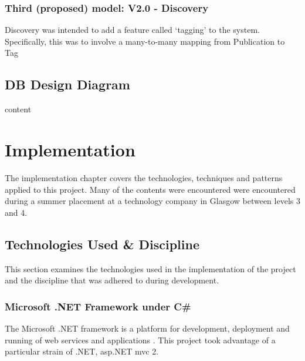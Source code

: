 \documentclass{l4proj}
\begin{document}
\subsection{Third (proposed) model: V2.0 - Discovery}
\label{designDiscovery}
Discovery was intended to add a feature called `tagging' to the system.  \\
Specifically, this was to involve a many-to-many mapping from Publication to Tag


\section{DB Design Diagram}
content


\chapter{Implementation}
\label{impl}
The implementation chapter covers the technologies, techniques and patterns applied to this project.  Many of the contents were encountered were encountered during a summer placement at a technology company in Glasgow between levels 3 and 4.  

\section{Technologies Used \& Discipline}
This section examines the technologies used in the implementation of the project and the discipline that was adhered to during development.

\subsection{Microsoft .NET Framework under C\#}
The Microsoft .NET framework is a platform for development, deployment and running of web services and applications \cite{whatIsDotNet}. This project took advantage of a particular strain of .NET, \gls{asp}.NET \gls{mvc} 2.  
\end{document}
